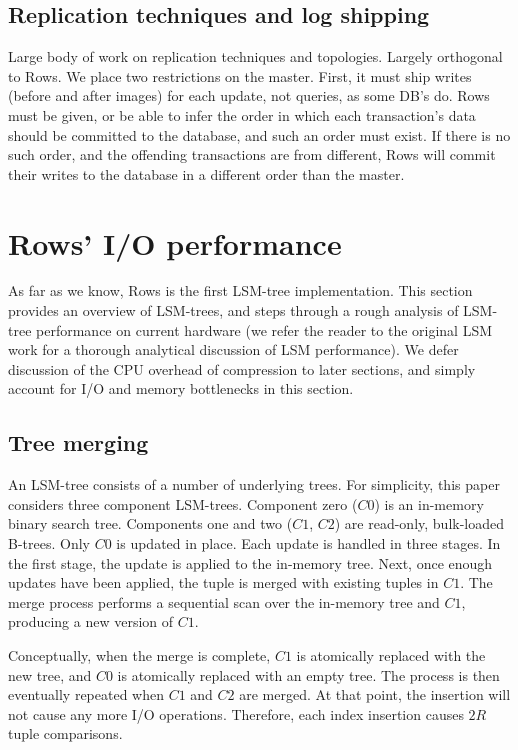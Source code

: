 \documentclass{sig-alternate-sigmod08}
\newcommand{\rows}{Rows\xspace}
\newcommand{\rowss}{Rows'\xspace}
\begin{document}
\subsection{Replication techniques and log shipping}
Large body of work on replication techniques and topologies.  Largely
orthogonal to \rows.  We place two restrictions on the master.  First,
it must ship writes (before and after images) for each update, not
queries, as some DB's do.  \rows must be given, or be able to infer
the order in which each transaction's data should be committed to the
database, and such an order must exist.  If there is no such order,
and the offending transactions are from different, \rows will commit
their writes to the database in a different order than the master.

\section{\rowss I/O performance}

As far as we know, \rows is the first LSM-tree implementation.  This
section provides an overview of LSM-trees, and steps through a rough
analysis of LSM-tree performance on current hardware (we refer the
reader to the original LSM work for a thorough analytical
discussion of LSM performance).  We defer discussion of the CPU
overhead of compression to later sections, and simply account for I/O
and memory bottlenecks in this section.

\subsection{Tree merging}


An LSM-tree consists of a number of underlying trees.  For simplicity,
this paper considers three component LSM-trees.  Component zero ($C0$)
is an in-memory binary search tree.  Components one and two ($C1$,
$C2$) are read-only, bulk-loaded B-trees.  Only $C0$ is updated in
place.  Each update is handled in three stages.  In the first stage,
the update is applied to the in-memory tree.  Next, once enough
updates have been applied, the tuple is merged with existing tuples in
$C1$.  The merge process performs a sequential scan over the in-memory
tree and $C1$, producing a new version of $C1$.

Conceptually, when the merge is complete, $C1$ is atomically replaced
with the new tree, and $C0$ is atomically replaced with an empty tree.
The process is then eventually repeated when $C1$ and $C2$ are merged.
At that point, the insertion will not cause any more I/O operations.
Therefore, each index insertion causes $2 R$ tuple comparisons.
\end{document}
